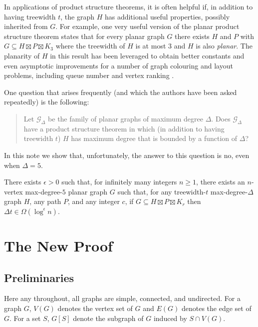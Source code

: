 \documentclass{patmorin}
\begin{document}
In applications of product structure theorems, it is often helpful if, in addition to having treewidth $t$, the graph $H$ has additional useful properties, possibly inherited from $G$.  For example, one very useful version of the planar product structure theorem states that for every planar graph $G$ there exists $H$ and $P$ with $G\subseteq H\boxtimes P\boxtimes K_3$ where the treewidth of $H$ is at most $3$ and $H$ is also \emph{planar}.  The planarity of $H$ in this result has been leveraged to obtain better constants and even asymptotic improvements for a number of graph colouring and layout problems, including queue number \cite{X} and vertex ranking \cite{X}.

One question that arises frequently (and which the authors have been asked repeatedly) is the following:
\begin{quote}
  Let $\mathcal{G}_\Delta$ be the family of planar graphs of maximum degree $\Delta$.  Does $\mathcal{G}_\Delta$ have a product structure theorem in which (in addition to having treewidth $t$) $H$ has maximum degree that is bounded by a function of $\Delta$?
\end{quote}
In this note we show that, unfortunately, the answer to this question is no, even when $\Delta=5$.

\begin{thm}\label{main_thm}
  There exists $\epsilon > 0$ such that, for infinitely many integers $n\ge 1$, there exists an $n$-vertex max-degree-$5$ planar graph $G$ such that, for any treewidth-$t$ max-degree-$\Delta$ graph $H$, any path $P$, and any integer $c$,  if $G\subseteq H\boxtimes P\boxtimes K_r$ then $\Delta t\in\Omega(\log^\epsilon n)$.
\end{thm}


\section{The New Proof}


\subsection{Preliminaries}

Here any throughout, all graphs are simple, connected, and undirected.  For a graph $G$, $V(G)$ denotes the vertex set of $G$ and $E(G)$ denotes the edge set of $G$.  For a set $S$, $G[S]$ denote the subgraph of $G$ induced by $S\cap V(G)$.
\end{document}
